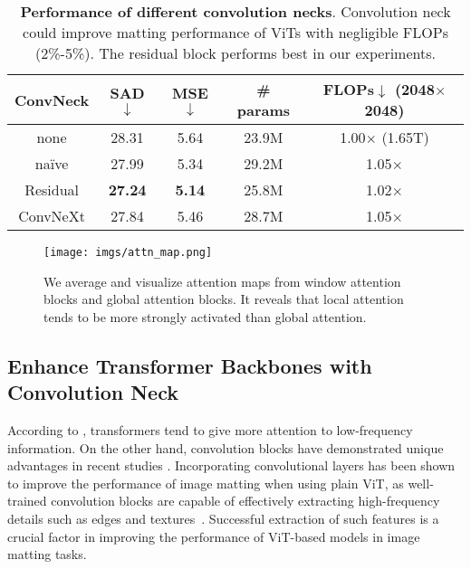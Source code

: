 \documentclass[10pt,twocolumn,letterpaper]{article}
\begin{document}
\begin{table}[tbp]
    \centering
    \renewcommand{\arraystretch}{1.1}
    \begin{tabular}{c|cccc}
    \toprule
        ConvNeck & SAD$\downarrow$ & MSE$\downarrow$ & \# params & \makecell[c]{FLOPs$\downarrow$ \\ (2048$\times$2048)}\\
    \midrule
    none     & 28.31          & 5.64           & 23.9M   & 1.00$\times$ (1.65T) \\
    \midrule
    na\"ive  & 27.99          & 5.34           & 29.2M   & 1.05$\times$ \\
    Residual & \textbf{27.24} & \textbf{5.14}  & 25.8M   & 1.02$\times$ \\
    ConvNeXt & 27.84          & 5.46           & 28.7M   & 1.05$\times$ \\
    \bottomrule
    \end{tabular}
    \caption{\textbf{Performance of different convolution necks}. Convolution neck could improve matting performance of ViTs with negligible FLOPs (2\%-5\%). The residual block performs best in our experiments.}
    \label{convs1}
\end{table}

\begin{figure}[tbp]
    \centering
    \texttt{[image: imgs/attn\_map.png]}
    \caption{We average and visualize attention maps from window attention blocks and global attention blocks. It reveals that local attention tends to be more strongly activated than global attention.}
    \label{fig:attn_map}
\end{figure}





\subsection{Enhance Transformer Backbones with Convolution Neck}

According to \cite{iformer}, transformers tend to give more attention to low-frequency information. On the other hand, convolution blocks have demonstrated unique advantages in recent studies \cite{xiao2021early, dai2021coatnet}. Incorporating convolutional layers has been shown to improve the performance of image matting when using plain ViT, as well-trained convolution blocks are capable of effectively extracting high-frequency details such as edges and textures~\cite{mimdet}. Successful extraction of such features is a crucial factor in improving the performance of ViT-based models in image matting tasks.
\end{document}

